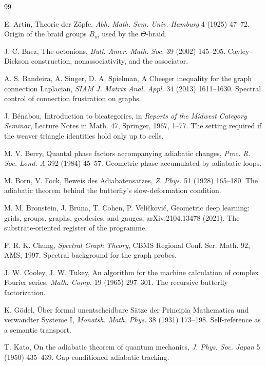 \documentclass[12pt,openany]{book}
\theoremstyle{remark}
\begin{document}
\begin{thebibliography}{99}

 E. Artin, Theorie der Z\"opfe, \emph{Abh. Math. Sem. Univ. Hamburg} 4 (1925) 47--72. Origin of the braid groups $B_m$ used by the $\Theta$-braid.

 J. C. Baez, The octonions, \emph{Bull. Amer. Math. Soc.} 39 (2002) 145--205. Cayley--Dickson construction, nonassociativity, and the associator.

 A. S. Bandeira, A. Singer, D. A. Spielman, A Cheeger inequality for the graph connection Laplacian, \emph{SIAM J. Matrix Anal. Appl.} 34 (2013) 1611--1630. Spectral control of connection frustration on graphs.

 J. B\'enabou, Introduction to bicategories, in \emph{Reports of the Midwest Category Seminar}, Lecture Notes in Math. 47, Springer, 1967, 1--77. The setting required if the weaver triangle identities hold only up to cells.

 M. V. Berry, Quantal phase factors accompanying adiabatic changes, \emph{Proc. R. Soc. Lond. A} 392 (1984) 45--57. Geometric phase accumulated by adiabatic loops.

 M. Born, V. Fock, Beweis des Adiabatensatzes, \emph{Z. Phys.} 51 (1928) 165--180. The adiabatic theorem behind the butterfly's slow-deformation condition.

 M. M. Bronstein, J. Bruna, T. Cohen, P. Veli\v{c}kovi\'c, Geometric deep learning: grids, groups, graphs, geodesics, and gauges, arXiv:2104.13478 (2021). The substrate-oriented register of the programme.

 F. R. K. Chung, \emph{Spectral Graph Theory}, CBMS Regional Conf. Ser. Math. 92, AMS, 1997. Spectral background for the graph probes.

 J. W. Cooley, J. W. Tukey, An algorithm for the machine calculation of complex Fourier series, \emph{Math. Comp.} 19 (1965) 297--301. The recursive butterfly factorization.

 K. G\"odel, \"Uber formal unentscheidbare S\"atze der Principia Mathematica und verwandter Systeme I, \emph{Monatsh. Math. Phys.} 38 (1931) 173--198. Self-reference as a semantic transport.

 T. Kato, On the adiabatic theorem of quantum mechanics, \emph{J. Phys. Soc. Japan} 5 (1950) 435--439. Gap-conditioned adiabatic tracking.


\end{thebibliography}
\end{document}
